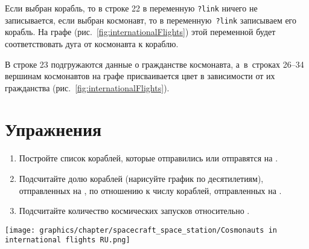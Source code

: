 Если выбран корабль, то в строке 22 в переменную \lstinline|?link| ничего не записывается, 
если выбран космонавт, то в переменную~\lstinline|?link| записываем его корабль. 
На графе (рис.~\ref{fig:internationalFlights}) этой переменной будет соответствовать дуга от космонавта к кораблю. 

В строке 23 подгружаются данные о гражданстве космонавта, 
а~в~строках 26--34 вершинам космонавтов на графе присваивается цвет в зависимости от их гражданства (рис.~\ref{fig:internationalFlights}). 



\section{Упражнения}
\begin{enumerate}
  \item Постройте список кораблей, которые отправились или отправятся на .
  \item Подсчитайте долю кораблей (нарисуйте график по десятилетиям), 
        отправленных на , 
        по отношению к числу кораблей, отправленных на .
  \item Подсчитайте количество  космических запусков 
      относительно .%
\end{enumerate}



\begin{figure*}[h]
\texttt{[image: graphics/chapter/spacecraft\_space\_station/Cosmonauts in international flights RU.png]}%
  \caption[Ракеты и космонавты на графе, 2022 год.]{Фрагмент графа c вершинами типа <<ракеты>> и <<космонавты>> с~раскраской по~странам. Красный цвет соответствует СССР и России, розовый~--- США, серый~--- Германии, бирюзовый~--- Франции, бордовый~--- Австралии, а голубой~--- Италии}
  \label{fig:internationalFlights}%
\end{figure*}
